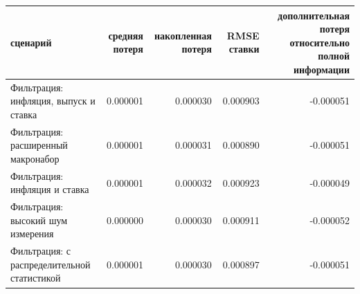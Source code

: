 \begin{tabular}{lrrrr}
\toprule
сценарий & средняя потеря & накопленная потеря & RMSE ставки & дополнительная потеря относительно полной информации \\
\midrule
Фильтрация: инфляция, выпуск и ставка & 0.000001 & 0.000030 & 0.000903 & -0.000051 \\
Фильтрация: расширенный макронабор & 0.000001 & 0.000031 & 0.000890 & -0.000051 \\
Фильтрация: инфляция и ставка & 0.000001 & 0.000032 & 0.000923 & -0.000049 \\
Фильтрация: высокий шум измерения & 0.000000 & 0.000030 & 0.000911 & -0.000052 \\
Фильтрация: с распределительной статистикой & 0.000001 & 0.000030 & 0.000897 & -0.000051 \\
\bottomrule
\end{tabular}
